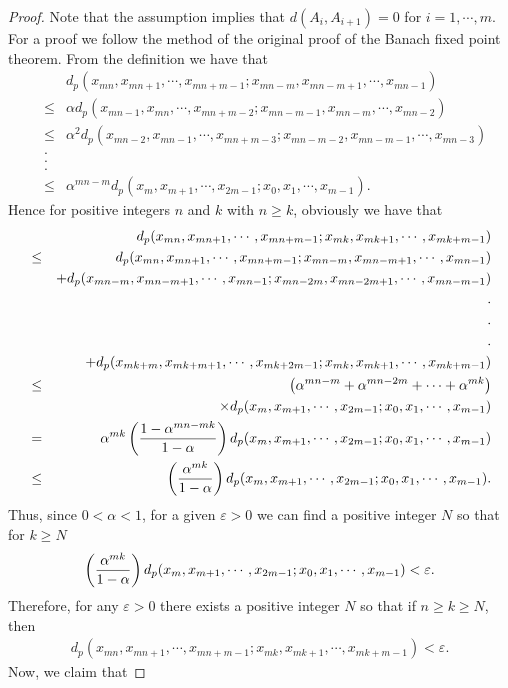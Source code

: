 \documentclass{amsart}
\theoremstyle{definition}
\theoremstyle{remark}
\begin{document}
\begin{proof}Note that the assumption implies that $d(A_i,A_{i+1})=0$ for $i=1,\cdots,m$. For a proof we follow the method of the original proof of the Banach fixed point theorem. From the definition we have that
 \begin{eqnarray*}&&d_p(x_{mn},x_{mn+1},\cdots,x_{mn+m-1};x_{mn-m},x_{mn-m+1},\cdots,x_{mn-1})\\&\leq& \alpha d_p(x_{mn-1},x_{mn},\cdots,x_{mn+m-2};x_{mn-m-1},x_{mn-m},\cdots,x_{mn-2})\\&\leq& \alpha^2d_p(x_{mn-2},x_{mn-1},\cdots,x_{mn+m-3};x_{mn-m-2},x_{mn-m-1},\cdots,x_{mn-3})\\&.&\qquad\qquad\qquad\qquad\qquad\qquad\qquad\\&.&\qquad\qquad\qquad\qquad\qquad\qquad\qquad\\&.&\qquad\qquad\qquad\qquad\qquad\qquad\qquad\\&\leq& \alpha^{mn-m}d_p(x_{m},x_{m+1},\cdots,x_{2m-1};x_{0},x_{1},\cdots,x_{m-1}).\qquad
\end{eqnarray*}
Hence for positive integers $n$ and $k$ with $n\geq k$, obviously we have that
\begin{eqnarray*}
&&d_p(x_{mn},x_{mn+1},\cdots,x_{mn+m-1};x_{mk},x_{mk+1},\cdots,x_{mk+m-1})\\&\leq&d_p(x_{mn},x_{mn+1},\cdots,x_{mn+m-1};x_{mn-m},x_{mn-m+1},\cdots,x_{mn-1})\\&&+d_p(x_{mn-m},x_{mn-m+1},\cdots,x_{mn-1};x_{mn-2m},x_{mn-2m+1},\cdots,x_{mn-m-1})\\&&.\\&&.\\&&.\\&&+d_p(x_{mk+m},x_{mk+m+1},\cdots,x_{mk+2m-1};x_{mk},x_{mk+1},\cdots,x_{mk+m-1})\\&\leq&\left(\alpha^{mn-m}+\alpha^{mn-2m}+\cdots+\alpha^{mk}\right)\\&&\times d_p(x_{m},x_{m+1},\cdots,x_{2m-1};x_{0},x_{1},\cdots,x_{m-1})\\&=&\alpha^{mk}\left({{1-\alpha^{mn-mk}}\over{1-\alpha}}\right)d_p(x_{m},x_{m+1},\cdots,x_{2m-1};x_{0},x_{1},\cdots,x_{m-1})\\&\leq&\left({{\alpha^{mk}}\over{1-\alpha}}\right)d_p(x_{m},x_{m+1},\cdots,x_{2m-1};x_{0},x_{1},\cdots,x_{m-1}).
\end{eqnarray*}
Thus, since $0<\alpha<1$, for a given $\varepsilon>0$ we can find a positive integer $N$ so that for $k\geq N$
\begin{eqnarray*}
\left({{\alpha^{mk}}\over{1-\alpha}}\right)d_p(x_{m},x_{m+1},\cdots,x_{2m-1};x_{0},x_{1},\cdots,x_{m-1})<\varepsilon.
\end{eqnarray*}
 Therefore, for any $\varepsilon>0$ there exists a positive integer $N$ so that if $n\geq k\geq N$, then
\begin{eqnarray}\label{BAN1}
d_p(x_{mn},x_{mn+1},\cdots,x_{mn+m-1};x_{mk},x_{mk+1},\cdots,x_{mk+m-1})<\varepsilon.
\end{eqnarray}
Now, we claim that


\end{proof}
\end{document}
